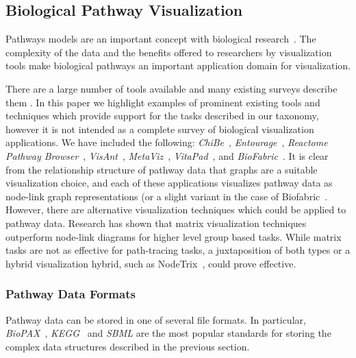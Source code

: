 \documentclass{egpubl}
\begin{document}
\subsection{Biological Pathway Visualization}


Pathways models are an important concept with biological research~\cite{cairns2011regulation, luo2003targeting,reya2001stem}.
The complexity of the data and the benefits offered to researchers by visualization tools make biological pathways an important application domain for visualization.


There are a large number of tools available and many existing surveys describe them \cite{Suderman2007tools,pavlopoulos2008survey,Gehlenborg2010omics}.
In this paper we highlight examples of prominent existing tools and techniques which provide support for the tasks described in our taxonomy, however it is not intended as a complete survey of biological visualization applications.
We have included the following: \textit{ChiBe}~\cite{Babur2010chibe}, \textit{Entourage}~\cite{Lex2013entourage}, \textit{Reactome Pathway Browser}~\cite{croft2014reactome}, \textit{VisAnt}~\cite{hu2004visant}, \textit{MetaViz}~\cite{bourqui2007metabolic}, \textit{VitaPad}~\cite{holford2005vitapad}, and \textit{BioFabric}~\cite{Longabaugh2012biofabric}. 
It is clear from the relationship structure of pathway data that graphs are a suitable visualization choice, and each of these applications visualizes pathway data as node-link graph representations (or a slight variant in the case of Biofabric~\cite{Longabaugh2012biofabric}.
However, there are alternative visualization techniques which could be applied to pathway data.
Research has shown that matrix visualization techniques outperform node-link diagrams for higher level group based tasks\cite{Ghoniem2004,Henry2007}.
While matrix tasks are not as effective for path-tracing tasks, a juxtaposition of both types or a hybrid visualization hybrid, such as NodeTrix~\cite{NodeTrix2007}, could prove effective.




 
\subsubsection{Pathway Data Formats}
Pathway data can be stored in one of several file formats.
In particular, \textit{BioPAX}~\cite{demir2010biopax}, \textit{KEGG}~\cite{kanehisa2000kegg} and \textit{SBML} \cite{Hucka2003} are the most popular standards for storing the complex data structures described in the previous section.
\end{document}
